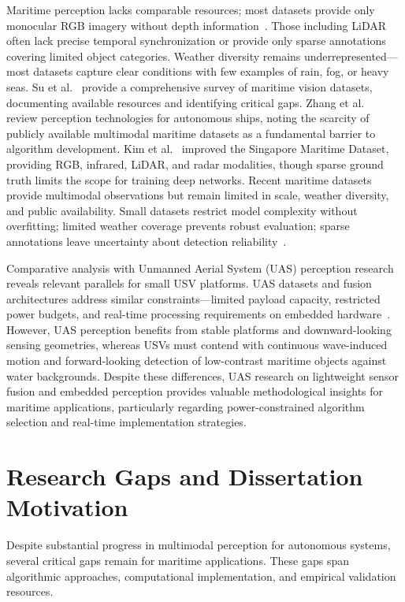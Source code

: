 \documentclass[../main.tex]{subfiles}
\begin{document}
Maritime perception lacks comparable resources; most datasets provide only monocular RGB imagery without depth information~\cite{su2023}.
Those including \ac{LiDAR} often lack precise temporal synchronization or provide only sparse annotations covering limited object categories.
Weather diversity remains underrepresented---most datasets capture clear conditions with few examples of rain, fog, or heavy seas.
Su et al.~\cite{su2023} provide a comprehensive survey of maritime vision datasets, documenting available resources and identifying critical gaps.
Zhang et al.~\cite{zhang2021} review perception technologies for autonomous ships, noting the scarcity of publicly available multimodal maritime datasets as a fundamental barrier to algorithm development.
Kim et al.~\cite{kim2022} improved the Singapore Maritime Dataset, providing RGB, infrared, \ac{LiDAR}, and radar modalities, though sparse ground truth limits the scope for training deep networks.
Recent maritime datasets~\cite{thompson2023} provide multimodal observations but remain limited in scale, weather diversity, and public availability.
Small datasets restrict model complexity without overfitting; limited weather coverage prevents robust evaluation; sparse annotations leave uncertainty about detection reliability~\cite{su2023}.

Comparative analysis with Unmanned Aerial System (UAS) perception research reveals relevant parallels for small USV platforms.
UAS datasets and fusion architectures address similar constraints---limited payload capacity, restricted power budgets, and real-time processing requirements on embedded hardware~\cite{thompson2023, haghbayan2018}.
However, UAS perception benefits from stable platforms and downward-looking sensing geometries, whereas USVs must contend with continuous wave-induced motion and forward-looking detection of low-contrast maritime objects against water backgrounds.
Despite these differences, UAS research on lightweight sensor fusion and embedded perception provides valuable methodological insights for maritime applications, particularly regarding power-constrained algorithm selection and real-time implementation strategies.

\section{Research Gaps and Dissertation Motivation}

Despite substantial progress in multimodal perception for autonomous systems, several critical gaps remain for maritime applications.
These gaps span algorithmic approaches, computational implementation, and empirical validation resources.
\end{document}
